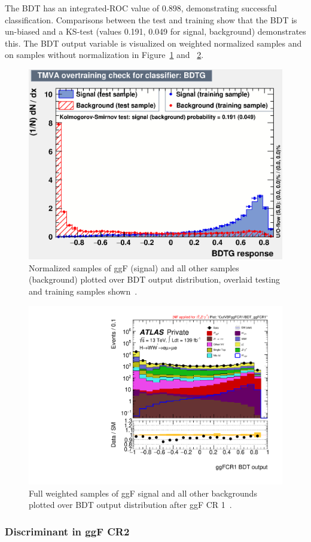 The BDT has an integrated-ROC value of 0.898, demonstrating successful classification. Comparisons between the test and training show that the BDT is un-biased and a KS-test (values 0.191, 0.049 for signal, background) demonstrates this. The BDT output variable is visualized on weighted normalized samples and on samples without normalization in Figure~\ref{fig:ggFCR1BDTresult} and ~\ref{fig:ggFCR1BDTresult2}.

\begin{figure}[!htbp]
\centering
  \includegraphics[width=.45\linewidth]{Pictures/ggFCR1/overtrain_BDTG.eps}
\caption{Normalized samples of ggF (signal) and all other samples (background) plotted over BDT output distribution, overlaid testing and training samples shown~\cite{ourSupportNote}.}
\label{fig:ggFCR1BDTresult}
\end{figure}

\begin{figure}[!htbp]
\centering
  \includegraphics[width=.45\linewidth]{Pictures/run2-emme-CutVBFggFCR1-BDT_ggFCR1-log.pdf}
\caption{Full weighted samples of ggF signal and all other backgrounds plotted over BDT output distribution after ggF CR 1~\cite{ourSupportNote}.}
\label{fig:ggFCR1BDTresult2}
\end{figure}

\newpage
\subsubsection{Discriminant in ggF CR2}

